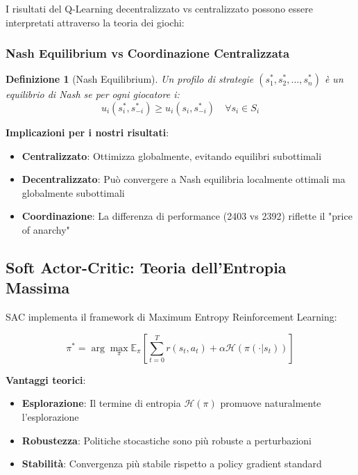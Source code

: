 \documentclass[12pt,a4paper,twoside]{report}
\newtheorem{definition}{Definizione}[section]
\begin{document}
\begin{appendices}
I risultati del Q-Learning decentralizzato vs centralizzato possono essere interpretati attraverso la teoria dei giochi:

\subsubsection{Nash Equilibrium vs Coordinazione Centralizzata}

\begin{definition}[Nash Equilibrium]
Un profilo di strategie $(s_1^*, s_2^*, ..., s_n^*)$ è un equilibrio di Nash se per ogni giocatore i:
$$u_i(s_i^*, s_{-i}^*) \geq u_i(s_i, s_{-i}^*) \quad \forall s_i \in S_i$$
\end{definition}

\textbf{Implicazioni per i nostri risultati}:
\begin{itemize}
    \item \textbf{Centralizzato}: Ottimizza globalmente, evitando equilibri subottimali
    \item \textbf{Decentralizzato}: Può convergere a Nash equilibria localmente ottimali ma globalmente subottimali
    \item \textbf{Coordinazione}: La differenza di performance (2403 vs 2392) riflette il "price of anarchy"
\end{itemize}

\subsection{Soft Actor-Critic: Teoria dell'Entropia Massima}

SAC implementa il framework di Maximum Entropy Reinforcement Learning:

\begin{equation}
\pi^* = \arg\max_\pi \mathbb{E}_{\pi} \left[ \sum_{t=0}^T r(s_t, a_t) + \alpha \mathcal{H}(\pi(\cdot|s_t)) \right]
\end{equation}

\textbf{Vantaggi teorici}:
\begin{itemize}
    \item \textbf{Esplorazione}: Il termine di entropia $\mathcal{H}(\pi)$ promuove naturalmente l'esplorazione
    \item \textbf{Robustezza}: Politiche stocastiche sono più robuste a perturbazioni
    \item \textbf{Stabilità}: Convergenza più stabile rispetto a policy gradient standard
\end{itemize}


\end{appendices}
\end{document}
